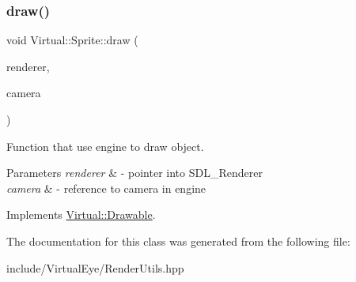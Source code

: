 \subsubsection{\texorpdfstring{draw()}{draw()}}
{\footnotesize\ttfamily void Virtual\+::\+Sprite\+::draw (\begin{DoxyParamCaption}\item[{S\+D\+L\+\_\+\+Renderer $\ast$}]{renderer,  }\item[{\hyperlink{class_virtual_1_1_camera}{Camera} \&}]{camera }\end{DoxyParamCaption})\hspace{0.3cm}{\ttfamily [virtual]}}



Function that use engine to draw object. 


\begin{DoxyParams}{Parameters}
{\em renderer} & -\/ pointer into S\+D\+L\+\_\+\+Renderer \\
\hline
{\em camera} & -\/ reference to camera in engine \\
\hline
\end{DoxyParams}


Implements \hyperlink{class_virtual_1_1_drawable_af7014800911efa59b96e538149e56f8b}{Virtual\+::\+Drawable}.



The documentation for this class was generated from the following file\+:\begin{DoxyCompactItemize}
\item 
include/\+Virtual\+Eye/Render\+Utils.\+hpp\end{DoxyCompactItemize}
